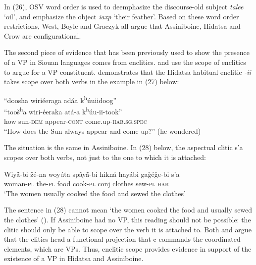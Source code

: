 \documentclass[output=paper]{LSP/langsci}
\begin{document}
In (26), OSV word order is used to deemphasize the discourse-old subject \textit{talee} `oil', and emphasize the object \textit{iaxp} `their feather'.  Based on these word order restrictions, West, Boyle and Graczyk all argue that Assiniboine, Hidatsa and Crow are configurational. 
	
The second piece of evidence that has been previously used to show the presence of a VP in Siouan languages comes from enclitics. \citet{West2003} and \citet{Boyle2007} use the scope of enclitics to argue for a VP constituent. \citet{Boyle2007} demonstrates that the Hidatsa habitual enclitic \textit{-ii} takes scope over both verbs in the example in (27) below:

\begin{exe}
\ex 
\glll ``doosha	wiri\'eeraga 	ad\'aa 	 k\textsuperscript{h}\'uuiidoog''\\
``too\v{s}\textsuperscript{h}a 	wiri-\'eeraka 	at\'a-a k\textsuperscript{h}\'uu-ii-took'' \\
how 	sun-\textsc{dem} 	appear-\textsc{cont}  come.up-\textsc{hab.sg.spec} \\
\trans ``How does the Sun always appear and come up?'' (he wondered) \citep[223]{Boyle2007}
\end{exe}

The situation is the same in Assiniboine.  In (28) below, the aspectual clitic s'a scopes over both verbs, not just to the one to which it is attached:

\begin{exe}
\ex \gll Wiy\'{\~a}-bi 		\v{z}\'e-na 	woy\'uta 	sp\~ay\'{\~a}-bi 	hikn\'a 	hay\'abi 		ga\v{g}\'e\v{g}e-bi 	s'a \\
woman-\textsc{pl} the-\textsc{pl} 	food 	cook-\textsc{pl} 	conj 	clothes 	sew-\textsc{pl} 	\textsc{hab} \\
\trans `The women usually cooked the food and sewed the clothes' \citep[39]{West2003}
\end{exe}

The sentence in (28) cannot mean `the women cooked the food and usually sewed the clothes' (\citealt{West2003}).  If Assiniboine had no VP, this reading should not be possible: the clitic should only be able to scope over the verb it is attached to. Both \citet{Boyle2007} and \citet{West2003} argue that the clitics head a functional projection that c-commands the coordinated elements, which are VPs.  Thus, enclitic scope provides evidence in support of the existence of a VP in Hidatsa and Assiniboine.
	
\end{document}
